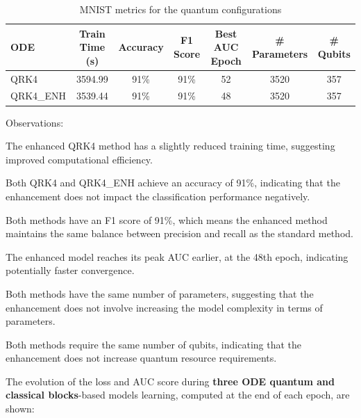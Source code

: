 \documentclass[12pt,a4paper]{report}
\begin{document}
\begin{table}[th]\small\linespread{1}
  \label{tab:classical_MNIST_3}
  \centering
  \begin{tabular}{|l|c|c|c|c|c|c|}
    \hline
    \textbf{ODE} & \textbf{Train Time (s)} & \textbf{Accuracy} & \textbf{F1 Score} & \textbf{Best AUC Epoch} & \textbf{\# Parameters} & \textbf{\# Qubits} \\
    \hline
    QRK4         & 3594.99                 & 91\%              & 91\%              & 52                      & 3520                   & 357                \\
    QRK4\_ENH    & 3539.44                 & 91\%              & 91\%              & 48                      & 3520                   & 357                \\
    \hline
  \end{tabular}
  \caption{MNIST metrics for the quantum configurations}
\end{table}

Observations:

The enhanced QRK4 method has a slightly reduced training time, suggesting improved computational efficiency.

Both QRK4 and QRK4\_ENH achieve an accuracy of 91\%, indicating that the enhancement does not impact the classification performance negatively.

Both methods have an F1 score of 91\%, which means the enhanced method maintains the same balance between precision and recall as the standard method.

The enhanced model reaches its peak AUC earlier, at the 48th epoch, indicating potentially faster convergence.

Both methods have the same number of parameters, suggesting that the enhancement does not involve increasing the model complexity in terms of parameters.

Both methods require the same number of qubits, indicating that the enhancement does not increase quantum resource requirements.

\clearpage
The evolution of the loss and AUC score during \textbf{three ODE quantum and classical blocks}-based models learning, computed at the end of each epoch, are shown:
\end{document}
